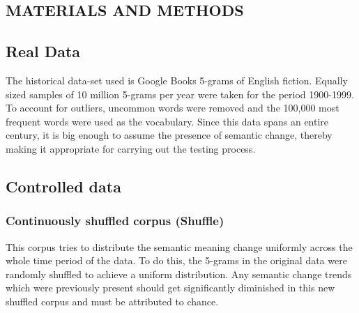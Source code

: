 \documentclass[a0,landscape]{a0poster}
\begin{document}
\begin{multicols}{4}


\color{DarkSlateGray} %




\section*{MATERIALS AND METHODS}


\subsection*{Real Data}
The historical data-set used is Google Books 5-grams of English fiction. Equally sized samples of 10 million 5-grams per year were taken for the period 1900-1999. To account for outliers, uncommon words were removed and the 100,000 most frequent words were used as the vocabulary. Since this data spans an entire century, it is big enough to assume the presence of semantic change, thereby making it appropriate for carrying out the testing process.

\subsection*{Controlled data}
\subsubsection*{Continuously shuffled corpus (Shuffle)}
This corpus tries to distribute the semantic meaning change uniformly across the whole time period of the data. To do this, the 5-grams in the original data were randomly shuffled to achieve a uniform distribution. Any semantic change trends which were previously present should get significantly diminished in this new shuffled corpus and must be attributed to chance.


\end{multicols}
\end{document}
